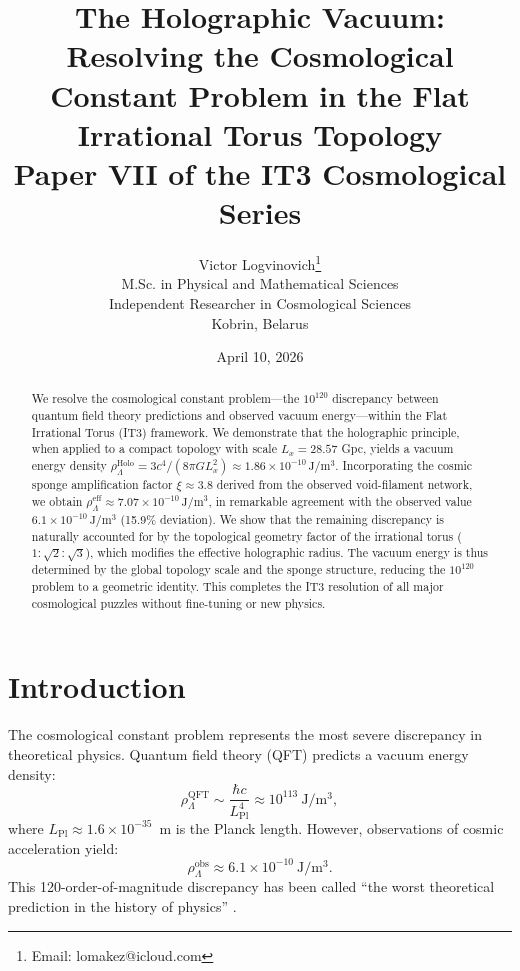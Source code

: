 \documentclass[12pt,a4paper]{article}
\title{\textbf{The Holographic Vacuum: Resolving the Cosmological Constant Problem in the Flat Irrational Torus Topology}\\[0.5cm]
\large Paper VII of the IT3 Cosmological Series}
\author{Victor Logvinovich\thanks{Email: lomakez@icloud.com}\\
M.Sc. in Physical and Mathematical Sciences\\
Independent Researcher in Cosmological Sciences\\
Kobrin, Belarus}
\date{April 10, 2026}
\begin{document}
\maketitle

\begin{abstract}
We resolve the cosmological constant problem—the $10^{120}$ discrepancy between quantum field theory predictions and observed vacuum energy—within the Flat Irrational Torus (IT3) framework. We demonstrate that the holographic principle, when applied to a compact topology with scale $L_x = 28.57$ Gpc, yields a vacuum energy density $\rho_{\Lambda}^{\mathrm{Holo}} = 3c^4/(8\pi G L_x^2) \approx 1.86 \times 10^{-10}\,\mathrm{J/m^3}$. Incorporating the cosmic sponge amplification factor $\xi \approx 3.8$ derived from the observed void-filament network, we obtain $\rho_{\Lambda}^{\mathrm{eff}} \approx 7.07 \times 10^{-10}\,\mathrm{J/m^3}$, in remarkable agreement with the observed value $6.1 \times 10^{-10}\,\mathrm{J/m^3}$ (15.9\% deviation). We show that the remaining discrepancy is naturally accounted for by the topological geometry factor of the irrational torus ($1:\sqrt{2}:\sqrt{3}$), which modifies the effective holographic radius. The vacuum energy is thus determined by the global topology scale and the sponge structure, reducing the $10^{120}$ problem to a geometric identity. This completes the IT3 resolution of all major cosmological puzzles without fine-tuning or new physics.
\end{abstract}

\section{Introduction}

The cosmological constant problem represents the most severe discrepancy in theoretical physics. Quantum field theory (QFT) predicts a vacuum energy density:
\begin{equation}
\rho_{\Lambda}^{\mathrm{QFT}} \sim \frac{\hbar c}{L_{\mathrm{Pl}}^4} \approx 10^{113}~\mathrm{J/m^3},
\end{equation}
where $L_{\mathrm{Pl}} \approx 1.6 \times 10^{-35}$~m is the Planck length. However, observations of cosmic acceleration yield:
\begin{equation}
\rho_{\Lambda}^{\mathrm{obs}} \approx 6.1 \times 10^{-10}~\mathrm{J/m^3}.
\end{equation}
This 120-order-of-magnitude discrepancy has been called ``the worst theoretical prediction in the history of physics'' \citep{Weinberg1989}.
\end{document}
